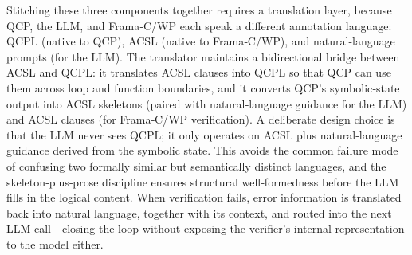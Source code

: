 
Stitching these three components together requires a translation layer, because QCP, the LLM, and Frama‑C/WP each speak a different annotation language: QCPL (native to QCP), ACSL (native to Frama‑C/WP), and natural-language prompts (for the LLM). The translator maintains a bidirectional bridge between ACSL and QCPL: it translates ACSL clauses into QCPL so that QCP can use them across loop and function boundaries, and it converts QCP’s symbolic‑state output into ACSL skeletons (paired with natural‑language guidance for the LLM) and ACSL clauses (for Frama‑C/WP verification). A deliberate design choice is that the LLM never sees QCPL; it only operates on ACSL plus natural‑language guidance derived from the symbolic state. This avoids the common failure mode of confusing two formally similar but semantically distinct languages, and the skeleton‑plus‑prose discipline ensures structural well‑formedness before the LLM fills in the logical content. When verification fails, error information is translated back into natural language, together with its context, and routed into the next LLM call—closing the loop without exposing the verifier’s internal representation to the model either.

